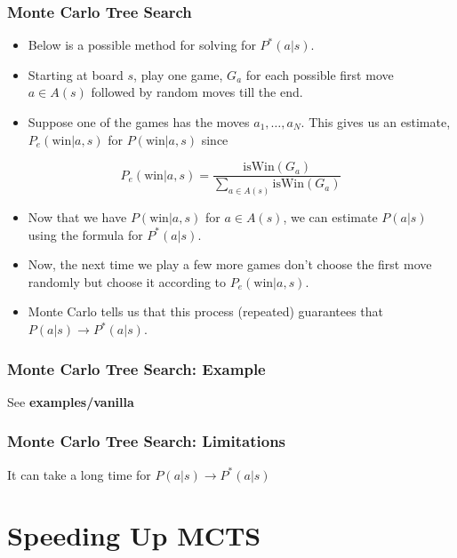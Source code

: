 \documentclass{beamer}
\begin{document}
\begin{frame}
  \frametitle{Monte Carlo Tree Search}
  \begin{itemize}
  \item Below is a possible method for solving for $P^*(a | s)$.
    \pause
  \item Starting at board $s$, play one game, $G_a$ for each possible first move $a \in A(s)$ followed by random moves till the end.
  \pause
  \item Suppose one of the games has the moves $a_1, \dots, a_N$. This gives us an estimate, $P_e(\text{win} | a, s)$ for $P(\text{win} | a, s)$ since
  \end{itemize}
  \pause
  \begin{displaymath}
    P_e(\text{win} | a, s) = \frac{\text{isWin}(G_a)}{\sum_{a \in A(s)} \text{isWin}(G_a)}
  \end{displaymath}
  \begin{itemize}
  \item Now that we have $P(\text{win} | a, s)$ for $a \in A(s)$, we can estimate $P(a | s)$ using the formula for $P^*(a | s)$.
    \pause
  \item Now, the next time we play a few more games don't choose the first move randomly but choose it according to $P_e(\text{win} | a, s)$.
    \pause
  \item Monte Carlo tells us that this process (repeated) guarantees that $P(a | s) \longrightarrow P^*(a | s)$.
  \end{itemize}
\end{frame}

\begin{frame}
  \frametitle{Monte Carlo Tree Search: Example}
  \begin{center}
    See \textbf{examples/vanilla}
  \end{center}
\end{frame}

\begin{frame}
  \frametitle{Monte Carlo Tree Search: Limitations}
  \begin{center}
    It can take a long time for $P(a | s) \longrightarrow P^*(a | s)$
  \end{center}
\end{frame}

\section{Speeding Up MCTS}
\end{document}
